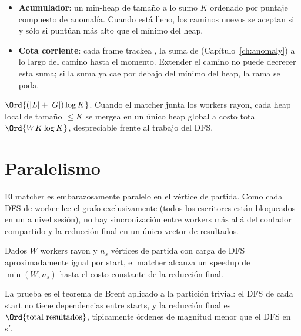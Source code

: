 \begin{itemize}
    \item \textbf{Acumulador}: un min-heap de tamaño a lo sumo $K$
        ordenado por puntaje compuesto de anomalía. Cuando está
        lleno, los caminos nuevos se aceptan si y sólo si puntúan
        más alto que el mínimo del heap.
    \item \textbf{Cota corriente}: cada frame trackea
        , la suma de
         (Capítulo~\ref{ch:anomaly})
        a lo largo del camino hasta el momento. Extender el
        camino no puede decrecer esta suma; si la suma ya cae por
        debajo del mínimo del heap, la rama se poda.
\end{itemize}

\begin{algorithm}
\caption{\textsc{Merge-Into-TopK}}\label{alg:merge-topk}
\end{algorithm}

\begin{complexity}
$\Ord{(|L| + |G|) \log K}$. Cuando el matcher junta los workers
rayon, cada heap local de tamaño $\leq K$ se mergea en un único
heap global a costo total $\Ord{W K \log K}$, despreciable frente
al trabajo del DFS.
\end{complexity}

\section{Paralelismo}

El matcher es embarazosamente paralelo en el vértice de partida.
Como cada DFS de worker lee el grafo exclusivamente (todos los
escritores están bloqueados en un  a nivel
sesión), no hay sincronización entre workers más allá del
contador compartido  y la reducción final en un único
vector de resultados.

\begin{theorem}
Dados $W$ workers rayon y $n_s$ vértices de partida con carga de
DFS aproximadamente igual por start, el matcher alcanza un
speedup de $\min(W, n_s)$ hasta el costo constante de la
reducción final.
\end{theorem}

La prueba es el teorema de Brent aplicado a la partición trivial:
el DFS de cada start no tiene dependencias entre starts, y la
reducción final es $\Ord{\text{total resultados}}$, típicamente
órdenes de magnitud menor que el DFS en sí.

